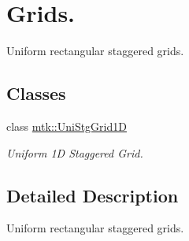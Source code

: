 \hypertarget{group__c06-grids}{\section{Grids.}
\label{group__c06-grids}
}


Uniform rectangular staggered grids.  


\subsection*{Classes}
\begin{DoxyCompactItemize}
\item 
class \hyperlink{classmtk_1_1UniStgGrid1D}{mtk\-::\-Uni\-Stg\-Grid1\-D}
\begin{DoxyCompactList}\small\item\em Uniform 1\-D Staggered Grid. \end{DoxyCompactList}\end{DoxyCompactItemize}


\subsection{Detailed Description}
Uniform rectangular staggered grids. 
